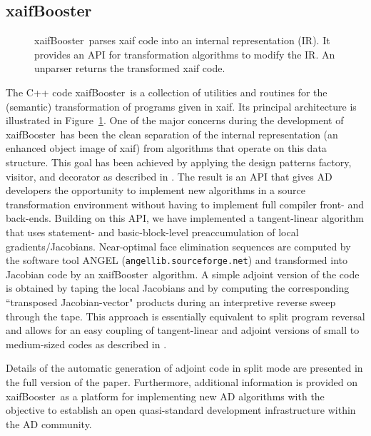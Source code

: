 \documentclass[acmtocl,acmnow]{acmtrans2m}
\newcommand{\xaifBooster}{xaifBooster}
\newcommand{\reffig}[1]{Figure~\ref{#1}}
\begin{document}
\subsection{\xaifBooster} 
\begin{figure}
\caption{\xaifBooster\ parses xaif code into an internal representation (IR).
It provides an API for transformation algorithms to modify the IR. An unparser
returns the transformed xaif code.} \label{fig:xaifBooster}
\end{figure}
The C++ code \xaifBooster\ is a collection of utilities and routines for the
(semantic) transformation of programs given in xaif. Its principal architecture 
is illustrated in \reffig{fig:xaifBooster}. One of the major concerns during
the development of \xaifBooster\ has been the clean separation of the internal
representation (an enhanced object image of xaif) from algorithms that operate 
on this data structure. This goal has been achieved by applying the design 
patterns \cite{DesignPatterns} factory, visitor, and decorator as described in \cite{UtNa03}.
The result is an API that gives AD developers the opportunity
to implement new algorithms in a source transformation environment without
having to implement full compiler front- and back-ends. Building on
this API, we have implemented a tangent-linear algorithm that uses statement-
\cite{SEUpreacc} and basic-block-level preaccumulation of local 
gradients/Jacobians. Near-optimal face elimination \cite{ElimTechMP} sequences 
are computed by the software tool 
ANGEL \cite{AGN03,SAGA} ({\tt angellib.sourceforge.net}) and transformed into 
Jacobian code by
an \xaifBooster\ algorithm. A simple adjoint version of the code is obtained
by taping the local Jacobians 
and by computing the corresponding ``transposed Jacobian-vector" products 
during an interpretive reverse sweep through the tape. This approach is
essentially equivalent to split program reversal \cite{Gri00} and allows
for an easy coupling of tangent-linear and adjoint versions of small to 
medium-sized codes as described in \cite{NaHe03}. 

Details of the automatic generation of adjoint code in split mode are presented
in the full version of the paper. Furthermore, additional information is 
provided on \xaifBooster\ as a platform for implementing new AD algorithms with 
the objective to establish an open quasi-standard development infrastructure
within the AD community.
\end{document}
